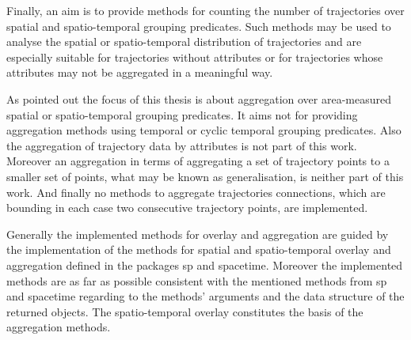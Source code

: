 \documentclass[12pt, oneside, a4paper]{scrbook}
\newcommand{\pkg}[1]{{\normalfont\fontseries{b}\selectfont #1}}
\let\code=\texttt
\begin{document}
\par\medskip

Finally, an aim is to provide methods for counting the number of trajectories over spatial and spatio-temporal grouping predicates. Such methods may be used to analyse the spatial or spatio-temporal distribution of trajectories and are especially suitable for trajectories without attributes or for trajectories whose attributes may not be aggregated in a meaningful way.
\par\medskip

As pointed out the focus of this thesis is about aggregation over area-measured spatial or spatio-temporal grouping predicates.
It aims not for providing aggregation methods using temporal or cyclic temporal grouping predicates.
Also the aggregation of trajectory data by attributes is not part of this work.
Moreover an aggregation in terms of aggregating a set of trajectory points to a smaller set of points, what may be known as generalisation, is neither part of this work.
And finally no methods to aggregate trajectories connections, which are bounding in each case two consecutive trajectory points, are implemented.
\par\medskip


Generally the implemented methods for overlay and aggregation are guided by the implementation of the methods for spatial and spatio-temporal overlay and aggregation defined in the packages \pkg{sp} and \pkg{spacetime}.
Moreover the implemented methods are as far as possible consistent with the mentioned methods from \pkg{sp} and \pkg{spacetime} regarding to the methods' arguments and the data structure of the returned objects. The spatio-temporal overlay constitutes the basis of the aggregation methods.
\par\medskip
\end{document}

